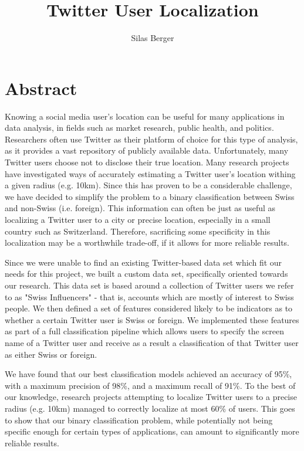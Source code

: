 \documentclass[10pt,a4paper]{article}
\title{Twitter User Localization\\[0.2em]\smaller{Master Thesis Report}}
\author{Silas Berger}
\begin{document}
\maketitle
\clearpage

\section*{Abstract}
Knowing a social media user's location can be useful for many applications in data analysis, in fields such as market research, public health, and politics. Researchers often use Twitter as their platform of choice for this type of analysis, as it provides a vast repository of publicly available data. Unfortunately, many Twitter users choose not to disclose their true location. Many research projects have investigated ways of accurately estimating a Twitter user's location withing a given radius (e.g. 10km). Since this has proven to be a considerable challenge, we have decided to simplify the problem to a binary classification between Swiss and non-Swiss (i.e. foreign). This information can often be just as useful as localizing a Twitter user to a city or precise location, especially in a small country such as Switzerland. Therefore, sacrificing some specificity in this localization may be a worthwhile trade-off, if it allows for more reliable results.

Since we were unable to find an existing Twitter-based data set which fit our needs for this project, we built a custom data set, specifically oriented towards our research. This data set is based around a collection of Twitter users we refer to as "Swiss Influencers" - that is, accounts which are mostly of interest to Swiss people. We then defined a set of features considered likely to be indicators as to whether a certain Twitter user is Swiss or foreign. We implemented these features as part of a full classification pipeline which allows users to specify the screen name of a Twitter user and receive as a result a classification of that Twitter user as either Swiss or foreign. 

We have found that our best classification models achieved an accuracy of 95\%, with a maximum precision of 98\%, and a maximum recall of 91\%. To the best of our knowledge, research projects attempting to localize Twitter users to a precise radius (e.g. 10km) managed to correctly localize at most 60\% of users. This goes to show that our binary classification problem, while potentially not being specific enough for certain types of applications, can amount to significantly more reliable results.
\end{document}
